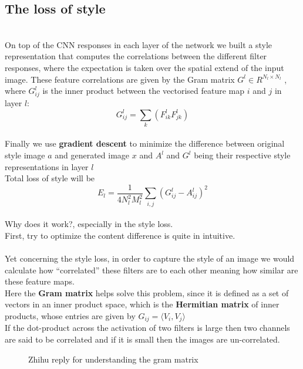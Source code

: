 \documentclass[11pt, a4paper]{article} %
\begin{document}
\subsection{The loss of style}
\\ On top of the CNN responses in each layer of the network we built a style representation
that computes the correlations between the different filter responses, where the expectation is
taken over the spatial extend of the input image. These feature correlations are given by the
Gram matrix $G^{l} \in R^{N_l \times N_l}$
, where $G^{l}_{ij}$ is the inner product between the vectorised feature map $i$ and $j$ in layer $l$:
\\ {\Large $$G^{l}_{ij} = \sum_{k}(F^{l}_{ik}F^l_{jk})$$}
\\ Finally we use \textbf{gradient descent} to minimize the difference between original style image $a$ and generated image $x$ and $A^l$ and $G^l$ being their respective style representations in layer $l$
\\ Total loss of style will be
\\ {\Large $$E_{l} = \frac{1}{4N^{2}_{l}M^2_{l}} \sum_{i, j}(G^{l}_{ij} - A^l_{ij})^2$$}
\\ {\Large Why does it work?, especially in the style loss.}
\\ First, try to optimize the content difference is quite in intuitive.
\\
\\ Yet concerning the style loss, in order to capture the style of an image we would calculate how “correlated” these filters are to each other meaning how similar are these feature maps.
\\ Here the \textbf{Gram matrix} helps solve this problem, since it is defined as a set of vectors in an inner product space, which is the \textbf{Hermitian matrix} of inner products, whose entries are given by $G_{ij} = \langle V_{i}, V_{j}\rangle$
\\ If the dot-product across the activation of two filters is large then two channels are said to be correlated and if it is small then the images are un-correlated.
\\ 
\begin{figure}[H]
    \centering
    \caption{Zhihu reply for understanding the gram matrix}
\end{figure}
\end{document}
